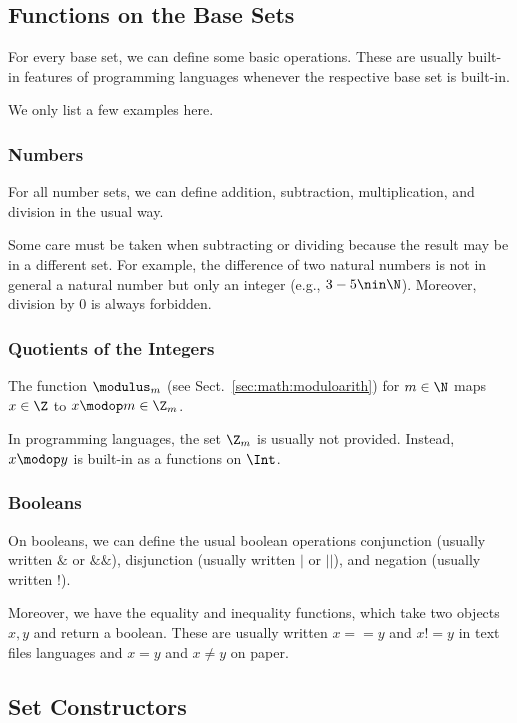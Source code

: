 \subsection{Functions on the Base Sets}\label{sec:math:sets:primfun}

For every base set, we can define some basic operations.
These are usually built-in features of programming languages whenever the respective base set is built-in.

We only list a few examples here.

\subsubsection{Numbers}
For all number sets, we can define addition, subtraction, multiplication, and division in the usual way.

Some care must be taken when subtracting or dividing because the result may be in a different set.
For example, the difference of two natural numbers is not in general a natural number but only an integer (e.g., $3-5\nin\N$).
Moreover, division by $0$ is always forbidden.

\subsubsection{Quotients of the Integers}
The function $\modulus_m$ (see Sect.~\ref{sec:math:moduloarith}) for $m\in \N$ maps $x\in\Z$ to $x\modop m\in\Z_m$.

In programming languages, the set $\Z_m$ is usually not provided.
Instead, $x\modop y$ is built-in as a functions on $\Int$.

\subsubsection{Booleans}
On booleans, we can define the usual boolean operations conjunction (usually written $\&$ or $\&\&$), disjunction (usually written $|$ or $||$), and negation (usually written $!$).

Moreover, we have the equality and inequality functions, which take two objects $x,y$ and return a boolean.
These are usually written $x==y$ and $x!=y$ in text files languages and $x=y$ and $x\neq y$ on paper.

\subsection{Set Constructors}\label{sec:math:sets:deriv}

